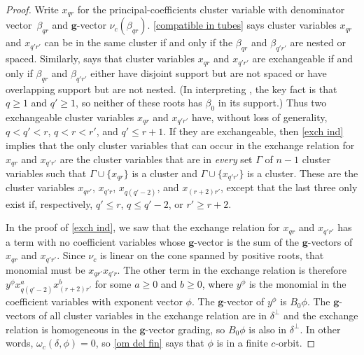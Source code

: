 \documentclass{amsart}
\theoremstyle{definition}
\theoremstyle{remark}
\numberwithin{equation}{section}
\newcommand{\set}[1]{{\lbrace #1 \rbrace}}
\newcommand{\0}{{\mathbf{0}}}
\newcommand{\g}{\mathbf{g}}
\begin{document}
\begin{proof}
Write $x_{qr}$ for the principal-coefficients cluster variable with denominator vector~$\beta_{qr}$ and $\g$-vector $\nu_c(\beta_{qr})$.
\cref{compatible in tubes} says cluster variables $x_{qr}$ and $x_{q'r'}$ can be in the same cluster if and only if the $\beta_{qr}$ and $\beta_{q'r'}$ are nested or spaced.
Similarly, \cite[Theorem~7.2]{affdenom} says that cluster variables $x_{qr}$ and $x_{q'r'}$ are exchangeable if and only if $\beta_{qr}$ and $\beta_{q'r'}$ either have disjoint support but are not spaced or have overlapping support but are not nested.
(In interpreting \cite[Theorem~7.2]{affdenom}, the key fact is that $q\ge1$ and $q'\ge 1$, so neither of these roots has $\beta_0$ in its support.)
Thus two exchangeable cluster variables $x_{qr}$ and $x_{q'r'}$ have, without loss of generality, $q<q'<r$, $q<r<r'$, and $q'\le r+1$.
If they are exchangeable, then \cref{exch ind} implies that the only cluster variables that can occur in the exchange relation for $x_{qr}$ and $x_{q'r'}$ are the cluster variables that are in \emph{every} set $\Gamma$ of $n-1$ cluster variables such that $\Gamma\cup\set{x_{qr}}$ is a cluster and $\Gamma\cup\set{x_{q'r'}}$ is a cluster.
These are the cluster variables $x_{qr'}$, $x_{q'r}$, $x_{q(q'-2)}$, and $x_{(r+2)r'}$, except that the last three only exist if, respectively, $q'\le r$, $q\le q'-2$, or $r'\ge r+2$.

In the proof of \cref{exch ind}, we saw that the exchange relation for $x_{qr}$ and $x_{q'r'}$ has a term with no coefficient variables whose $\g$-vector is the sum of the $\g$-vectors of $x_{qr}$ and $x_{q'r'}$.
Since $\nu_c$ is linear on the cone spanned by positive roots, that monomial must be $x_{qr'}x_{q'r}$.
The other term in the exchange relation is therefore $y^\phi x_{q(q'-2)}^ax_{(r+2)r'}^b$ for some $a\ge0$ and $b\ge0$, where $y^\phi$ is the monomial in the coefficient variables with exponent vector $\phi$.
The $\g$-vector of $y^\phi$ is $B_0\phi$.
The $\g$-vectors of all cluster variables in the exchange relation are in $\delta^\perp$ and the exchange relation is homogeneous in the $\g$-vector grading, so $B_0\phi$ is also in $\delta^\perp$.
In other words, $\omega_c(\delta,\phi)=0$, so \cref{om del fin} says that $\phi$ is in a finite $c$-orbit.


\end{proof}
\end{document}

